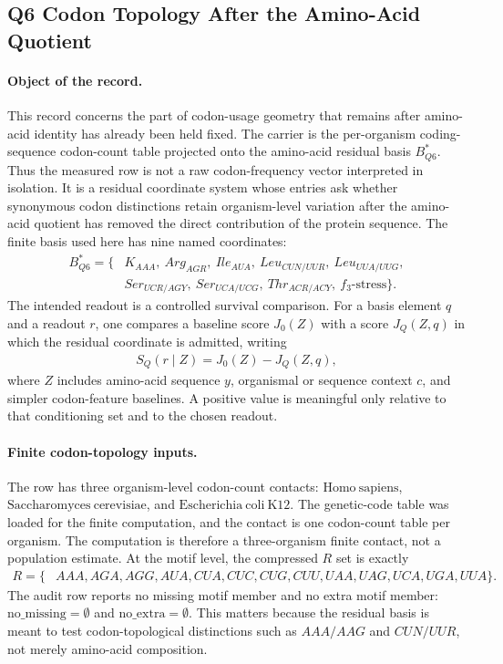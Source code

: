 \subsection{Q6 Codon Topology After the Amino-Acid Quotient}
\label{sec:bior-h3-codon-usage-topology-residual-basis-q6-topology-after-aa-quotient}

\paragraph{Object of the record.}
This record concerns the part of codon-usage geometry that remains after amino-acid identity has already been held fixed. The carrier is the per-organism coding-sequence codon-count table projected onto the amino-acid residual basis $B^{*}_{Q6}$. Thus the measured row is not a raw codon-frequency vector interpreted in isolation. It is a residual coordinate system whose entries ask whether synonymous codon distinctions retain organism-level variation after the amino-acid quotient has removed the direct contribution of the protein sequence. The finite basis used here has nine named coordinates:
$$
\begin{aligned}
B^{*}_{Q6} = \{&K_{AAA},\ Arg_{AGR},\ Ile_{AUA},\ Leu_{CUN/UUR},\ Leu_{UUA/UUG},\\
&Ser_{UCR/AGY},\ Ser_{UCA/UCG},\ Thr_{ACR/ACY},\ f_3\text{-stress}\}.
\end{aligned}
$$
The intended readout is a controlled survival comparison. For a basis element $q$ and a readout $r$, one compares a baseline score $J_0(Z)$ with a score $J_Q(Z,q)$ in which the residual coordinate is admitted, writing
$$
\begin{aligned}
S_Q(r\mid Z) = J_0(Z)-J_Q(Z,q),
\end{aligned}
$$
where $Z$ includes amino-acid sequence $y$, organismal or sequence context $c$, and simpler codon-feature baselines. A positive value is meaningful only relative to that conditioning set and to the chosen readout.

\paragraph{Finite codon-topology inputs.}
The row has three organism-level codon-count contacts: $\mathrm{Homo\ sapiens}$, $\mathrm{Saccharomyces\ cerevisiae}$, and $\mathrm{Escherichia\ coli\ K12}$. The genetic-code table was loaded for the finite computation, and the contact is one codon-count table per organism. The computation is therefore a three-organism finite contact, not a population estimate. At the motif level, the compressed $R$ set is exactly
$$
\begin{aligned}
R = \{&AAA, AGA, AGG, AUA, CUA, CUC, CUG, CUU, UAA, UAG, UCA, UGA, UUA\}.
\end{aligned}
$$
The audit row reports no missing motif member and no extra motif member: $\mathrm{no\_missing}=\emptyset$ and $\mathrm{no\_extra}=\emptyset$. This matters because the residual basis is meant to test codon-topological distinctions such as $AAA/AAG$ and $CUN/UUR$, not merely amino-acid composition.

